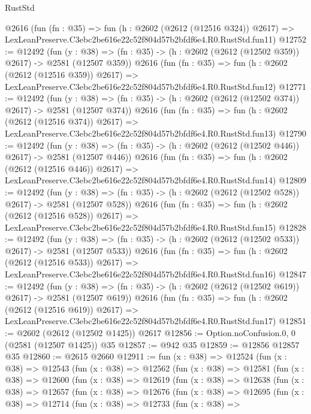 \begin{lexlean}{RustStd}
\begin{coremodule}
    @2616
    (fun (fn : @35) =>
    fun (h : @2602 (@2612 (@12516 @324)) @2617) =>
    LexLeanPreserve.C3ebc2be616e22c52f804d57b2bfdf6e4.R0.RustStd.fun11)
@12752 := @12492
    (fun (y : @38) => (fn : @35) -> (h : @2602 (@2612 (@12502 @359)) @2617) -> @2581 (@12507 @359))
    @2616
    (fun (fn : @35) =>
    fun (h : @2602 (@2612 (@12516 @359)) @2617) =>
    LexLeanPreserve.C3ebc2be616e22c52f804d57b2bfdf6e4.R0.RustStd.fun12)
@12771 := @12492
    (fun (y : @38) => (fn : @35) -> (h : @2602 (@2612 (@12502 @374)) @2617) -> @2581 (@12507 @374))
    @2616
    (fun (fn : @35) =>
    fun (h : @2602 (@2612 (@12516 @374)) @2617) =>
    LexLeanPreserve.C3ebc2be616e22c52f804d57b2bfdf6e4.R0.RustStd.fun13)
@12790 := @12492
    (fun (y : @38) => (fn : @35) -> (h : @2602 (@2612 (@12502 @446)) @2617) -> @2581 (@12507 @446))
    @2616
    (fun (fn : @35) =>
    fun (h : @2602 (@2612 (@12516 @446)) @2617) =>
    LexLeanPreserve.C3ebc2be616e22c52f804d57b2bfdf6e4.R0.RustStd.fun14)
@12809 := @12492
    (fun (y : @38) => (fn : @35) -> (h : @2602 (@2612 (@12502 @528)) @2617) -> @2581 (@12507 @528))
    @2616
    (fun (fn : @35) =>
    fun (h : @2602 (@2612 (@12516 @528)) @2617) =>
    LexLeanPreserve.C3ebc2be616e22c52f804d57b2bfdf6e4.R0.RustStd.fun15)
@12828 := @12492
    (fun (y : @38) => (fn : @35) -> (h : @2602 (@2612 (@12502 @533)) @2617) -> @2581 (@12507 @533))
    @2616
    (fun (fn : @35) =>
    fun (h : @2602 (@2612 (@12516 @533)) @2617) =>
    LexLeanPreserve.C3ebc2be616e22c52f804d57b2bfdf6e4.R0.RustStd.fun16)
@12847 := @12492
    (fun (y : @38) => (fn : @35) -> (h : @2602 (@2612 (@12502 @619)) @2617) -> @2581 (@12507 @619))
    @2616
    (fun (fn : @35) =>
    fun (h : @2602 (@2612 (@12516 @619)) @2617) =>
    LexLeanPreserve.C3ebc2be616e22c52f804d57b2bfdf6e4.R0.RustStd.fun17)
@12851 := @2602 (@2612 (@12502 @1425)) @2617
@12856 := Option.noConfusion.{0, 0} (@2581 (@12507 @1425)) @35
@12857 := @942 @35
@12859 := @12856 @12857 @35
@12860 := @2615 @2660
@12911 := fun (x : @38) =>
  @12524
    (fun (x : @38) =>
    @12543
      (fun (x : @38) =>
      @12562
        (fun (x : @38) =>
        @12581
          (fun (x : @38) =>
          @12600
            (fun (x : @38) =>
            @12619
              (fun (x : @38) =>
              @12638
                (fun (x : @38) =>
                @12657
                  (fun (x : @38) =>
                  @12676
                    (fun (x : @38) =>
                    @12695
                      (fun (x : @38) =>
                      @12714
                        (fun (x : @38) =>
                        @12733
                          (fun (x : @38) =>

\end{coremodule}
\end{lexlean}
